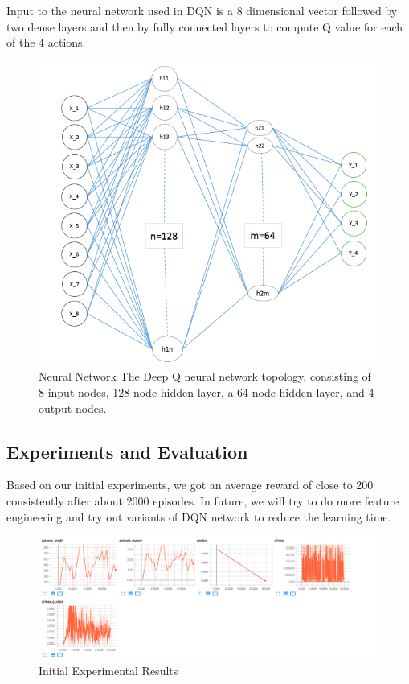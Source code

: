 Input to the neural network used in DQN is a 8 dimensional vector followed by two dense layers and then by fully connected layers to compute Q value for each of the 4 actions.
\begin{figure}%
\centering
\includegraphics[width=1.0\columnwidth]{figures/DNN_image.png}%
\caption{Neural Network The Deep Q neural network topology, consisting of 8 input nodes, 128-node hidden layer, a 64-node hidden layer, and 4 output nodes.}%
\label{fig:datastats}%
\end{figure}

\subsection{Experiments and Evaluation}

Based on our initial experiments, we got an average reward of close to 200 consistently after about 2000 episodes. In future, we will try to do more feature engineering and try out variants of DQN network to reduce the learning time.

\begin{figure}%
\centering
\includegraphics[width=0.8\columnwidth]{figures/tensorboard.png}%
\caption{Initial Experimental Results}%
\label{fig:datastats}%
\end{figure}

